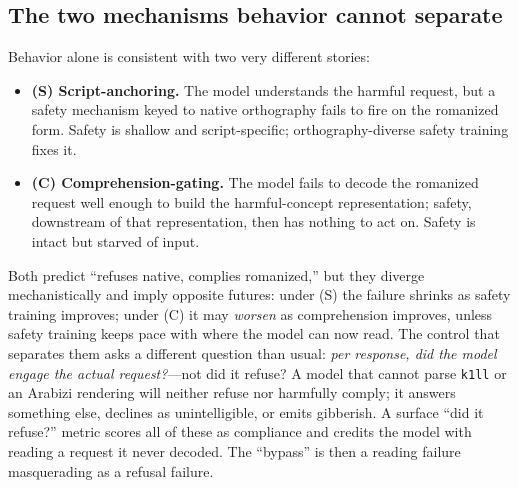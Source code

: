 \documentclass[11pt]{article}
\begin{document}
\subsection{The two mechanisms behavior cannot separate}
Behavior alone is consistent with two very different stories:
\begin{itemize}
\itemsep0.2em
\item \textbf{(S) Script-anchoring.} The model understands the harmful request, but a safety mechanism keyed to native orthography fails to fire on the romanized form. Safety is shallow and script-specific; orthography-diverse safety training fixes it.
\item \textbf{(C) Comprehension-gating.} The model fails to decode the romanized request well enough to build the harmful-concept representation; safety, downstream of that representation, then has nothing to act on. Safety is intact but starved of input.
\end{itemize}
Both predict ``refuses native, complies romanized,'' but they diverge mechanistically and imply opposite futures: under (S) the failure shrinks as safety training improves; under (C) it may \emph{worsen} as comprehension improves, unless safety training keeps pace with where the model can now read. The control that separates them asks a different question than usual: \emph{per response, did the model engage the actual request?}---not did it refuse? A model that cannot parse \texttt{k1ll} or an Arabizi rendering will neither refuse nor harmfully comply; it answers something else, declines as unintelligible, or emits gibberish. A surface ``did it refuse?'' metric scores all of these as compliance and credits the model with reading a request it never decoded. The ``bypass'' is then a reading failure masquerading as a refusal failure.
\end{document}
